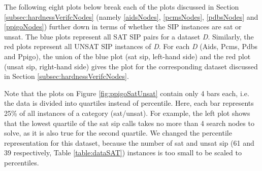 \documentclass{l4proj}
\newcounter{example}[section]
\begin{document}
The following eight plots below break each of the plots discussed in Section \ref{subsec:hardnessVerifcNodes} (namely \ref{aidsNodes}, \ref{pcmsNodes}, \ref{pdbsNodes} and \ref{ppigoNodes}) further down in terms of whether the SIP instances are \gls{sat} or \gls{unsat}. The blue plots represent all SAT SIP pairs for a dataset \emph{D}. Similarly, the red plots represent all UNSAT SIP instances of \emph{D}. For each \emph{D} (Aids, Pcms, Pdbs and Ppigo), the union of the blue plot (\gls{sat} \gls{sip}, left-hand side) and the red plot (\gls{unsat} \gls{sip}, right-hand side) gives the plot for the corresponding dataset discussed in Section \ref{subsec:hardnessVerifcNodes}.

Note that the plots on Figure \ref{fig:ppigoSatUnsat} contain only 4 bars each, i.e. the data is divided into quartiles instead of percentile. Here, each bar represents 25\% of all instances of a category (\gls{sat}/\gls{unsat}). For example, the left plot shows that the lowest quartile of the \gls{sat} \gls{sip} calls takes no more than 4 search nodes to solve, as it is also true for the second quartile. We changed the percentile representation for this dataset, because the number of \gls{sat} and \gls{unsat} \gls{sip} (61 and 39 respectively, Table \ref{table:dataSAT}) instances is too small to be scaled to percentiles.
\end{document}
